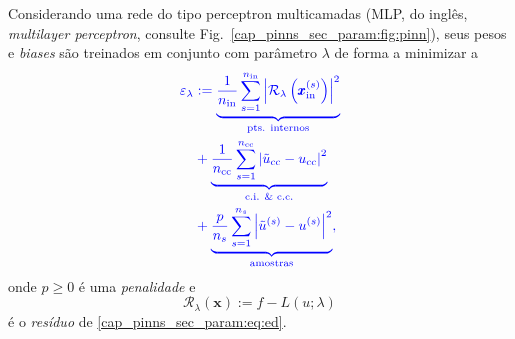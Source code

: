 Considerando uma rede do tipo perceptron multicamadas (MLP, do inglês, \textit{multilayer perceptron}, consulte Fig.~\ref{cap_pinns_sec_param:fig:pinn}), seus pesos e \textit{biases} são treinados em conjunto com parâmetro $\lambda$ de forma a minimizar a 
\begin{equation}\color{blue}\begin{aligned}
    &\varepsilon_\lambda := \underbrace{\frac{1}{n_{\text{in}}}\sum_{s=1}^{n_{\text{in}}}\left|\mathcal{R}_\lambda\left(\pmb{x}_{\text{in}}^{(s)}\right)\right|^2}_{\text{pts. internos}}\\
    &\quad + \underbrace{\frac{1}{n_{\text{cc}}}\sum_{s=1}^{n_{\text{cc}}}\left|\tilde{u}_{\text{cc}}-u_{\text{cc}}\right|^2}_{\text{c.i. \& c.c.}}\\
    &\quad + \underbrace{\frac{p}{n_s}\sum_{s=1}^{n_s}\left|\tilde{u}^{(s)}-u^{(s)}\right|^2}_{\text{amostras}},
  \end{aligned}
\end{equation}
onde $p\geq 0$ é uma \emph{penalidade} e
\begin{equation}
  \mathcal{R}_\lambda(\pmb{x}) := f - L(u;\lambda)
\end{equation}
é o \emph{resíduo} de \eqref{cap_pinns_sec_param:eq:ed}.

